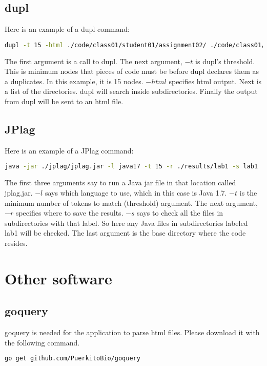 \documentclass[12pt]{article}
\begin{document}
		\subsection{dupl}
			Here is an example of a dupl command:
			\begin{lstlisting}[language=bash, breaklines=true]
dupl -t 15 -html ./code/class01/student01/assignment02/ ./code/class01/student02/assignment02/ ./code/class01/student03/assignment02/ > assignment02.html &
			\end{lstlisting}
			\noindent The first argument is a call to dupl. The next argument, $-t$ is dupl's threshold. This is minimum nodes that pieces of code must be before dupl declares them as a duplicates. In this example, it is 15 nodes. $-html$ specifies html output. Next is a list of the directories. dupl will search inside subdirectories. Finally the output from dupl will be sent to an html file.
			
		\subsection{JPlag}
			Here is an example of a JPlag command:
			\begin{lstlisting}[language=bash, breaklines=true]		
java -jar ./jplag/jplag.jar -l java17 -t 15 -r ./results/lab1 -s lab1 ./students
			\end{lstlisting}
			\noindent The first three arguments say to run a Java jar file in that location called jplag.jar. $-l$ says which language to use, which in this case is Java 1.7. $-t$ is the minimum number of tokens to match (threshold) argument. The next argument, $-r$ specifies where to save the results. $-s$ says to check all the files in subdirectories with that label. So here any Java files in subdirectories labeled lab1 will be checked. The last argument is the base directory where the code resides.
			
	\section{Other software}
		\subsection{goquery}
			goquery is needed for the application to parse html files. Please download it with the following command.
			\begin{lstlisting}[language=bash]
go get github.com/PuerkitoBio/goquery
			\end{lstlisting}	
			 
\end{document}
